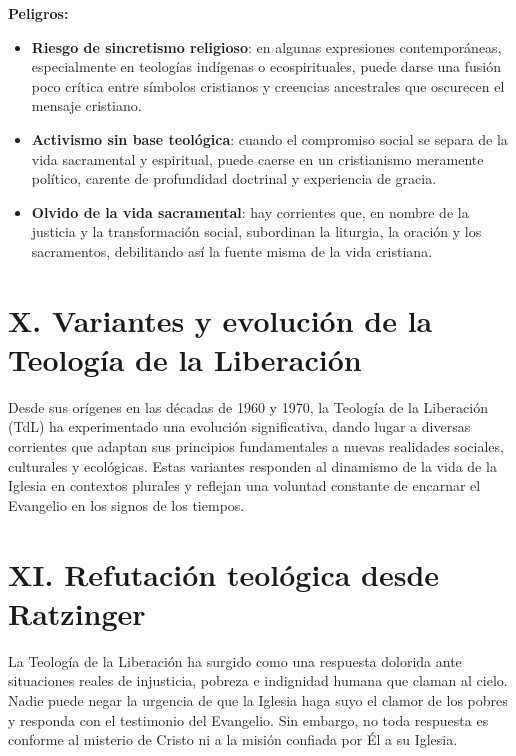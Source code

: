 \documentclass[12pt]{article}
\begin{document}
\textbf{Peligros:}
\begin{itemize}
    \item \textbf{Riesgo de sincretismo religioso}: en algunas expresiones contemporáneas, especialmente en teologías indígenas o ecospirituales, puede darse una fusión poco crítica entre símbolos cristianos y creencias ancestrales que oscurecen el mensaje cristiano.
    \item \textbf{Activismo sin base teológica}: cuando el compromiso social se separa de la vida sacramental y espiritual, puede caerse en un cristianismo meramente político, carente de profundidad doctrinal y experiencia de gracia.
    \item \textbf{Olvido de la vida sacramental}: hay corrientes que, en nombre de la justicia y la transformación social, subordinan la liturgia, la oración y los sacramentos, debilitando así la fuente misma de la vida cristiana.
\end{itemize}


\appendix

\section*{X. Variantes y evolución de la Teología de la Liberación}
Desde sus orígenes en las décadas de 1960 y 1970, la Teología de la Liberación (TdL) ha experimentado una evolución significativa, dando lugar a diversas corrientes que adaptan sus principios fundamentales a nuevas realidades sociales, culturales y ecológicas. Estas variantes responden al dinamismo de la vida de la Iglesia en contextos plurales y reflejan una voluntad constante de encarnar el Evangelio en los signos de los tiempos.


\section*{XI. Refutación teológica desde Ratzinger}
La Teología de la Liberación ha surgido como una respuesta dolorida ante situaciones reales de injusticia, pobreza e indignidad humana que claman al cielo. Nadie puede negar la urgencia de que la Iglesia haga suyo el clamor de los pobres y responda con el testimonio del Evangelio. Sin embargo, no toda respuesta es conforme al misterio de Cristo ni a la misión confiada por Él a su Iglesia.
\end{document}
